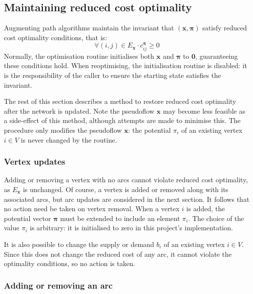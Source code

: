 \subsection{Maintaining reduced cost optimality} \label{sec:impl-incremental-maintaining-rc}

Augmenting path algorithms maintain the invariant that $\left(\mathbf{x},\boldsymbol{\pi}\right)$ satisfy reduced cost optimality conditions, that is:
\[\forall(i,j)\in E_{\mathbf{x}}\cdot c_{ij}^{\boldsymbol{\pi}}\geq 0\]
Normally, the optimisation routine initialises both $\mathbf{x}$ and $\boldsymbol{\pi}$ to $\mathbf{0}$, guaranteeing these conditions hold. When reoptimising, the initialisation routine is disabled: it is the responsibility of the caller to ensure the starting state satisfies the invariant.

The rest of this section describes a method to restore reduced cost optimality after the network is updated. Note the pseudoflow $\mathbf{x}$ may become less feasible as a side-effect of this method, although attempts are made to minimise this. The procedure only modifies the pseudoflow $\mathbf{x}$: the potential $\pi_i$ of an existing vertex $i \in V$ is never changed by the routine.

\subsubsection{Vertex updates}

Adding or removing a vertex with no arcs cannot violate reduced cost optimality, as $E_\mathbf{x}$ is unchanged. Of course, a vertex is added or removed along with its associated arcs\footnotemark, but arc updates are considered in the next section. It follows that no action need be taken on vertex removal. When a vertex $i$ is added, the potential vector $\boldsymbol{\pi}$ must be extended to include an element $\pi_i$. The choice of the value $\pi_i$ is arbitrary: it is initialised to zero in this project's implementation.

It is also possible to change the supply or demand $b_i$ of an existing vertex $i \in V$\footnotemark. Since this does not change the reduced cost of any arc, it cannot violate the optimality conditions, so no action is taken.

\subsubsection{Adding or removing an arc}

